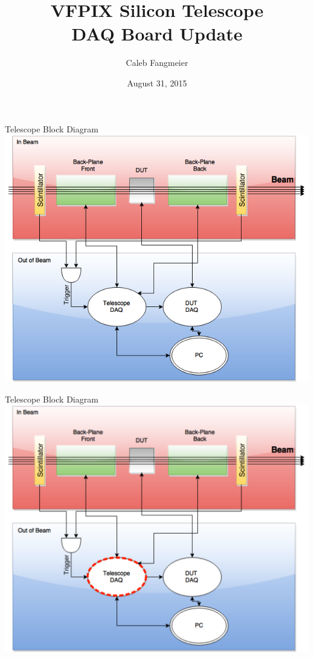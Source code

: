 \documentclass{beamer}
\title{VFPIX Silicon Telescope \\ DAQ Board Update}
\author[C. Fangmeier]{Caleb Fangmeier}
\institute[UNL]{Univ.\ of Nebraska \-- Lincoln}
\date{August 31, 2015}
\begin{document}
\begin{frame}[plain]
  \titlepage
  \addtocounter{framenumber}{-1}
\end{frame}


\begin{frame}{Telescope Block Diagram}
  \centering
  \includegraphics[height=0.95\textheight]{figures/Telescope_Hierarchy}
\end{frame}

\begin{frame}{Telescope Block Diagram}
  \centering
  \includegraphics[height=0.95\textheight]{figures/Telescope_Hierarchy_Emph}
\end{frame}
\end{document}
